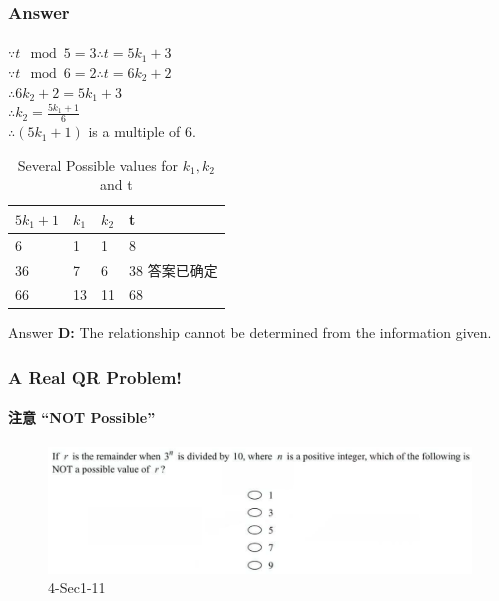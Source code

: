 \documentclass[
	11pt, %
	handout,
]{beamer}
\begin{document}

\begin{frame}
	\frametitle{Answer}
	\framesubtitle{}

	$\because t \mod 5 = 3 \therefore t = 5  k_1 + 3$ \\
	$\because t \mod 6 = 2 \therefore t = 6  k_2 + 2$ \\
	$\therefore 6 k_2 + 2  = 5  k_1 + 3 $ \\
	$\therefore k_2 = \frac{5  k_1 + 1}{6}$ \\

	\bigskip
	$\therefore (5k_1 + 1)$ is a multiple of 6. 
		\begin{table}
		\begin{tabular}{l l l l}
			\toprule
			\textbf{$5  k_1 + 1$} & \textbf{$k_1$} & \textbf{$k_2$} & \textbf{t}\\
			\midrule
			6& 1 & 1 & 8 \\
			36& 7 & 6 & \alert{38} 答案已确定\\
			66& 13 & 11 & 68 \\
			\bottomrule
		\end{tabular}
		\caption{Several Possible values for $k_1, k_2$ and t}
	\end{table}

	

\bigskip
Answer \textbf{D: } The relationship cannot be determined from the information given.
\end{frame}




\begin{frame}
	\frametitle{A Real QR Problem!}
	\framesubtitle{注意 “NOT Possible”}
	\begin{figure}
		\includegraphics[width=\linewidth]{Remainder_Example_Question3.png}
		\caption{4-Sec1-11}
		\end{figure}
\end{frame}

\end{document}
